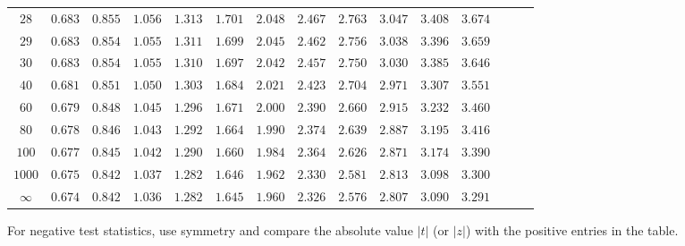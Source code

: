\begin{center}
\begin{tabular}{@{}c*{14}{r}@{}}
$28$ & $0.683$ & $0.855$ & $1.056$ & $1.313$ & $1.701$ & $2.048$ & $2.467$ & $2.763$ & $3.047$ & $3.408$ & $3.674$ \\
$29$ & $0.683$ & $0.854$ & $1.055$ & $1.311$ & $1.699$ & $2.045$ & $2.462$ & $2.756$ & $3.038$ & $3.396$ & $3.659$ \\
$30$ & $0.683$ & $0.854$ & $1.055$ & $1.310$ & $1.697$ & $2.042$ & $2.457$ & $2.750$ & $3.030$ & $3.385$ & $3.646$ \\
$40$ & $0.681$ & $0.851$ & $1.050$ & $1.303$ & $1.684$ & $2.021$ & $2.423$ & $2.704$ & $2.971$ & $3.307$ & $3.551$ \\
$60$ & $0.679$ & $0.848$ & $1.045$ & $1.296$ & $1.671$ & $2.000$ & $2.390$ & $2.660$ & $2.915$ & $3.232$ & $3.460$ \\
$80$ & $0.678$ & $0.846$ & $1.043$ & $1.292$ & $1.664$ & $1.990$ & $2.374$ & $2.639$ & $2.887$ & $3.195$ & $3.416$ \\
$100$ & $0.677$ & $0.845$ & $1.042$ & $1.290$ & $1.660$ & $1.984$ & $2.364$ & $2.626$ & $2.871$ & $3.174$ & $3.390$ \\
$1000$ & $0.675$ & $0.842$ & $1.037$ & $1.282$ & $1.646$ & $1.962$ & $2.330$ & $2.581$ & $2.813$ & $3.098$ & $3.300$ \\
$\infty$ & $0.674$ & $0.842$ & $1.036$ & $1.282$ & $1.645$ & $1.960$ & $2.326$ & $2.576$ & $2.807$ & $3.090$ & $3.291$ \\
\bottomrule
\end{tabular}
\end{center}

\vspace{0.08cm}

\small
For negative test statistics, use symmetry and compare the absolute value $|t|$ (or $|z|$) with the positive entries in the table.
